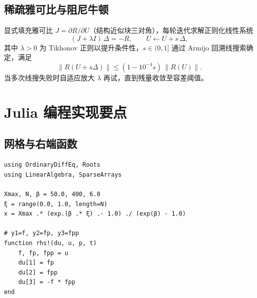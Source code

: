 \documentclass[12pt]{article}
\begin{document}
\subsection*{稀疏雅可比与阻尼牛顿}
显式填充雅可比 \(J=\partial R/\partial U\)（结构近似块三对角），每轮迭代求解正则化线性系统
\begin{equation}
  (J+\lambda I)\,\Delta = -R,\qquad U\leftarrow U + s\,\Delta,
\end{equation}
其中 \(\lambda>0\) 为 Tikhonov 正则以提升条件性，\(s\in(0,1]\) 通过 Armijo 回溯线搜索确定，满足
\begin{equation}
  \|R(U+s\Delta)\| \le (1-10^{-4}s)\, \|R(U)\|.
\end{equation}
当多次线搜失败时自适应放大 \(\lambda\) 再试，直到残量收敛至容差阈值。

\section{Julia 编程实现要点}
\subsection*{网格与右端函数}
\begin{lstlisting}
using OrdinaryDiffEq, Roots
using LinearAlgebra, SparseArrays

Xmax, N, β = 50.0, 400, 6.0
ξ = range(0.0, 1.0, length=N)
x = Xmax .* (exp.(β .* ξ) .- 1.0) ./ (exp(β) - 1.0)

# y1=f, y2=fp, y3=fpp
function rhs!(du, u, p, t)
    f, fp, fpp = u
    du[1] = fp
    du[2] = fpp
    du[3] = -f * fpp
end
\end{lstlisting}
\end{document}
